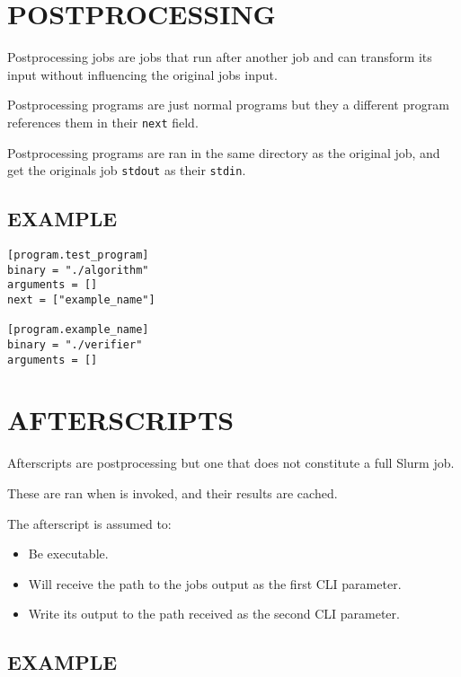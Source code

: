 \documentclass[a4paper,english]{article}
\begin{document}
\begin{adjustwidth}{18pt}{0pt}
    \section{POSTPROCESSING}

        Postprocessing jobs are jobs that run after another job and
        can transform its input without influencing the original jobs input.

        Postprocessing programs are just normal programs but they a different
        program references them in their \texttt{next} field.

        Postprocessing programs are ran in the same directory as the original
        job, and get the originals job \texttt{stdout} as their \texttt{stdin}.

        \subsection{EXAMPLE}

            \begin{verbatim}
[program.test_program]
binary = "./algorithm"
arguments = []
next = ["example_name"]

[program.example_name]
binary = "./verifier"
arguments = []
            \end{verbatim}

    \section{AFTERSCRIPTS}

        Afterscripts are postprocessing but one that does not constitute
        a full Slurm job.

        These are ran when   is invoked, and their results are
        cached.

        The afterscript is assumed to:

        \begin{itemize}
            \item Be executable.
            \item Will receive the path to the jobs output as the first CLI parameter.
            \item Write its output to the path received as the second CLI parameter.
        \end{itemize}

        \subsection{EXAMPLE}


\end{adjustwidth}
\end{document}
